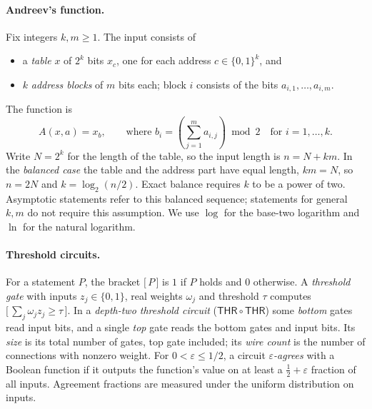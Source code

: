 \documentclass[11pt,letterpaper]{article}
\theoremstyle{remark}
\newcommand{\bits}{\{0,1\}}
\newcommand{\ind}[1]{\bigl[\,#1\,\bigr]}
\newcommand{\THR}{\mathsf{THR}}
\begin{document}
\paragraph*{Andreev's function.}
Fix integers $k,m\ge1$. The input consists of
\begin{itemize}
\item a \emph{table} $x$ of $2^k$ bits $x_c$, one for each address
      $c\in\bits^k$, and
\item $k$ \emph{address blocks} of $m$ bits each; block $i$ consists of the bits
      $a_{i,1},\dots,a_{i,m}$.
\end{itemize}
The function is
\[
A(x,a)=x_b,\qquad\text{where }b_i=\left(\sum_{j=1}^m a_{i,j}\right)\bmod 2\quad\text{for }i=1,\dots,k.
\]
Write $N=2^k$ for the length of the table, so the input length is $n=N+km$.
In the \emph{balanced case} the table and the address part have equal
length, $km=N$, so $n=2N$ and $k=\log_2(n/2)$. Exact balance requires
$k$ to be a power of two. Asymptotic statements refer to this balanced
sequence; statements for general $k,m$ do not require this assumption.
We use $\log$ for the base-two logarithm and $\ln$ for the natural logarithm.

\paragraph*{Threshold circuits.}
For a statement $P$, the bracket $\ind{P}$ is $1$ if $P$ holds and $0$
otherwise. A \emph{threshold gate} with inputs $z_j\in\bits$, real weights
$\omega_j$ and threshold $\tau$ computes $\ind{\sum_j\omega_jz_j\ge\tau}$. In a \emph{depth-two threshold
circuit} ($\THR\circ\THR$) some \emph{bottom} gates read input bits, and a
single \emph{top} gate reads the bottom gates and input bits. Its
\emph{size} is its total number of gates, top gate included; its
\emph{wire count} is the number of connections with nonzero weight.
For $0<\varepsilon\le1/2$, a circuit \emph{$\varepsilon$-agrees} with a
Boolean function if it outputs the function's value on at least a
$\tfrac12+\varepsilon$ fraction of all inputs. Agreement fractions are
measured under the uniform distribution on inputs.
\end{document}
